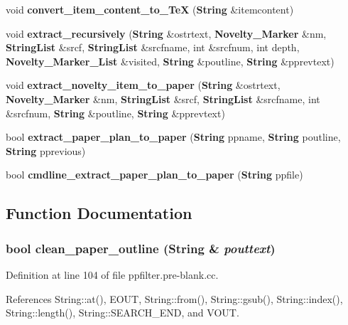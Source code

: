 \begin{CompactItemize}
void {\bf convert\_\-item\_\-content\_\-to\_\-Te\-X} ({\bf String} \&itemcontent)
\item 
void {\bf extract\_\-recursively} ({\bf String} \&ostrtext, {\bf Novelty\_\-Marker} \&nm, {\bf String\-List} \&srcf, {\bf String\-List} \&srcfname, int \&srcfnum, int depth, {\bf Novelty\_\-Marker\_\-List} \&visited, {\bf String} \&poutline, {\bf String} \&pprevtext)
\item 
void {\bf extract\_\-novelty\_\-item\_\-to\_\-paper} ({\bf String} \&ostrtext, {\bf Novelty\_\-Marker} \&nm, {\bf String\-List} \&srcf, {\bf String\-List} \&srcfname, int \&srcfnum, {\bf String} \&poutline, {\bf String} \&pprevtext)
\item 
bool {\bf extract\_\-paper\_\-plan\_\-to\_\-paper} ({\bf String} ppname, {\bf String} poutline, {\bf String} pprevious)
\item 
bool {\bf cmdline\_\-extract\_\-paper\_\-plan\_\-to\_\-paper} ({\bf String} ppfile)
\end{CompactItemize}


\subsection{Function Documentation}
\subsubsection{\setlength{\rightskip}{0pt plus 5cm}bool clean\_\-paper\_\-outline ({\bf String} \& {\em pouttext})}\label{ppfilter_8pre-blank_8cc_a3}




Definition at line 104 of file ppfilter.pre-blank.cc.

References String::at(), EOUT, String::from(), String::gsub(), String::index(), String::length(), String::SEARCH\_\-END, and VOUT.



